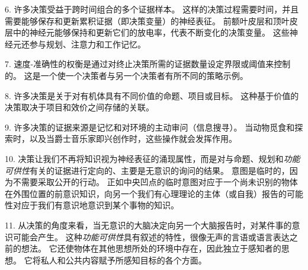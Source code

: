 6. 许多决策受益于跨时间组合的多个证据样本。
这样的决策过程需要时间，并且需要能够保存和更新累积证据（即决策变量）的神经表征。
前额叶皮层和顶叶皮层中的神经元能够保持和更新它们的放电率，代表不断变化的决策变量。
这些神经元还参与规划、注意力和工作记忆。


7. 速度-准确性的权衡是通过对终止决策所需的证据数量设定界限或阈值来控制的。
这是一个使一个决策者与另一个决策者有所不同的策略示例。


8. 许多决策是关于对有机体具有不同价值的命题、项目或目标。
这种基于价值的决策取决于项目和效价之间存储的关联。


9. 许多决策的证据来源是记忆和对环境的主动审问（信息搜寻）。
当动物觅食和探索时，以及当爵士音乐家即兴创作时，这些操作就会发挥作用。


10. 决策让我们不再将知识视为神经表征的涌现属性，而是对与命题、规划和\textit{功能可供性}有关的证据进行定向的、主要是无意识的询问的结果。
意图是临时的，因为不需要采取公开的行动。
正如中央凹点的临时意图对应于一个尚未识别的物体在外围位置的前意识知识，向另一个我们有心理理论的主体（或自我）报告的可能性对应于我们有意识地意识到某个事物的知识。


11. 从决策的角度来看，当无意识的大脑决定向另一个大脑报告时，对某件事的意识可能会产生。
这种\textit{功能可供性}具有叙述的特性，很像无声的言语或语言表达之前的想法。
它还使物体在其他思想所处的环境中存在，因此独立于感知者的思想。
它将私人和公共内容赋予所感知目标的各个方面。


